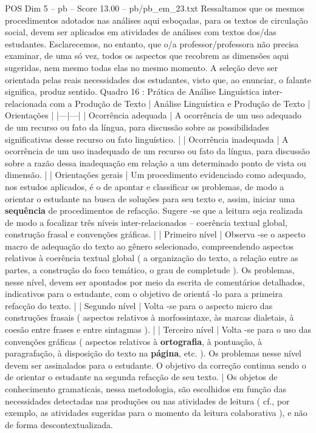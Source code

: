 \begin{textsample}{POS Dim 5 – pb – Score 13.00 – pb/pb\_em\_23.txt}
Ressaltamos que os mesmos procedimentos adotados nas análises aqui esboçadas, para os textos de circulação social, devem ser aplicados em atividades de análises com textos dos/das estudantes.
Esclarecemos, no entanto, que o/a professor/professora não precisa examinar, de uma só vez, todos os aspectos que recobrem as dimensões aqui sugeridas, nem mesmo todas elas no mesmo momento.
A seleção deve ser orientada pelas reais necessidades dos estudantes, visto que, ao enunciar, o falante significa, produz sentido.
Quadro 16 : Prática de Análise Linguística inter-relacionada com a Produção de Texto | Análise Linguística e Produção de Texto | Orientações | |---|---| | Ocorrência adequada | A ocorrência de um uso adequado de um recurso ou fato da língua, para discussão sobre as possibilidades significativas desse recurso ou fato linguístico. | | Ocorrência inadequada | A ocorrência de um uso inadequado de um recurso ou fato da língua, para discussão sobre a razão dessa inadequação em relação a um determinado ponto de vista ou dimensão. | | Orientações gerais | Um procedimento evidenciado como adequado, nos estudos aplicados, é o de apontar e classificar os problemas, de modo a orientar o estudante na busca de soluções para seu texto e, assim, iniciar uma \textbf{sequência} de procedimentos de refacção.
Sugere -se que a leitura seja realizada de modo a focalizar três níveis inter-relacionados – coerência textual global, construção frasal e convenções gráficas. | | Primeiro nível | Observa -se o aspecto macro de adequação do texto ao gênero selecionado, compreendendo aspectos relativos à coerência textual global ( a organização do texto, a relação entre as partes, a construção do foco temático, o grau de completude ).
Os problemas, nesse nível, devem ser apontados por meio da escrita de comentários detalhados, indicativos para o estudante, com o objetivo de orientá -lo para a primeira refacção do texto. | | Segundo nível | Volta -se para o aspecto micro das construções frasais ( aspectos relativos à morfossintaxe, às marcas dialetais, à coesão entre frases e entre sintagmas ). | | Terceiro nível | Volta -se para o uso das convenções gráficas ( aspectos relativos à \textbf{ortografia}, à pontuação, à paragrafação, à disposição do texto na \textbf{página}, etc. ).
Os problemas nesse nível devem ser assinalados para o estudante.
O objetivo da correção continua sendo o de orientar o estudante na segunda refacção de seu texto. | Os objetos de conhecimento gramaticais, nessa metodologia, são escolhidos em função das necessidades detectadas nas produções ou nas atividades de leitura ( cf., por exemplo, as atividades sugeridas para o momento da leitura colaborativa ), e não de forma descontextualizada.

\end{textsample}
